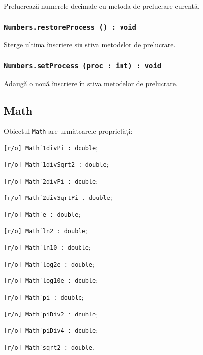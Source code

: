 Prelucrează numerele decimale cu metoda de prelucrare curentă.

\subsubsection{\texttt{Numbers.restoreProcess () : void}}

Șterge ultima înscriere sin stiva metodelor de prelucrare.

\subsubsection{\texttt{Numbers.setProcess (proc : int) : void}}

Adaugă o nouă înscriere în stiva metodelor de prelucrare.

\subsection{{\color{orange} Math}}

Obiectul \texttt{Math} are următoarele proprietăți:
\begin{icItems}
	\item \texttt{[r/o] Math'1divPi : double};
	\item \texttt{[r/o] Math'1divSqrt2 : double};
	\item \texttt{[r/o] Math'2divPi : double};
	\item \texttt{[r/o] Math'2divSqrtPi : double};
	\item \texttt{[r/o] Math'e : double};
	\item \texttt{[r/o] Math'ln2 : double};
	\item \texttt{[r/o] Math'ln10 : double};
	\item \texttt{[r/o] Math'log2e : double};
	\item \texttt{[r/o] Math'log10e : double};
	\item \texttt{[r/o] Math'pi : double};
	\item \texttt{[r/o] Math'piDiv2 : double};
	\item \texttt{[r/o] Math'piDiv4 : double};
	\item \texttt{[r/o] Math'sqrt2 : double}.
\end{icItems}


